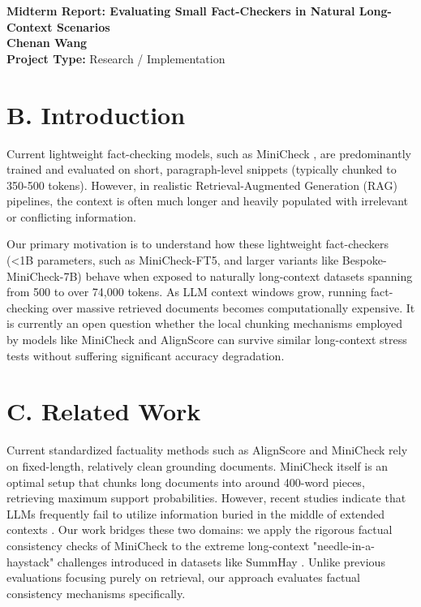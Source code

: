 \documentclass[12pt, letterpaper]{article}
\begin{document}
\begin{center}
    \textbf{\Large Midterm Report: Evaluating Small Fact-Checkers in Natural Long-Context Scenarios} \\
    \vspace{0.5em}
    \textbf{Chenan Wang} \\
    \textbf{Project Type:} Research / Implementation
\end{center}

\vspace{1em}

\section*{B. Introduction}

Current lightweight fact-checking models, such as MiniCheck \cite{tang2024minicheck}, are predominantly trained and evaluated on short, paragraph-level snippets (typically chunked to 350-500 tokens). However, in realistic Retrieval-Augmented Generation (RAG) pipelines, the context is often much longer and heavily populated with irrelevant or conflicting information. 

Our primary motivation is to understand how these lightweight fact-checkers (<1B parameters, such as MiniCheck-FT5, and larger variants like Bespoke-MiniCheck-7B) behave when exposed to naturally long-context datasets spanning from 500 to over 74,000 tokens. As LLM context windows grow, running fact-checking over massive retrieved documents becomes computationally expensive. It is currently an open question whether the local chunking mechanisms employed by models like MiniCheck \cite{tang2024minicheck} and AlignScore \cite{zha2023alignscore} can survive similar long-context stress tests without suffering significant accuracy degradation.

\section*{C. Related Work}

Current standardized factuality methods such as AlignScore \cite{zha2023alignscore} and MiniCheck \cite{tang2024minicheck} rely on fixed-length, relatively clean grounding documents. MiniCheck itself is an optimal setup that chunks long documents into around 400-word pieces, retrieving maximum support probabilities. However, recent studies indicate that LLMs frequently fail to utilize information buried in the middle of extended contexts \cite{laban2024summary}. Our work bridges these two domains: we apply the rigorous factual consistency checks of MiniCheck to the extreme long-context "needle-in-a-haystack" challenges introduced in datasets like SummHay \cite{laban2024summary}. Unlike previous evaluations focusing purely on retrieval, our approach evaluates factual consistency mechanisms specifically.
\end{document}
